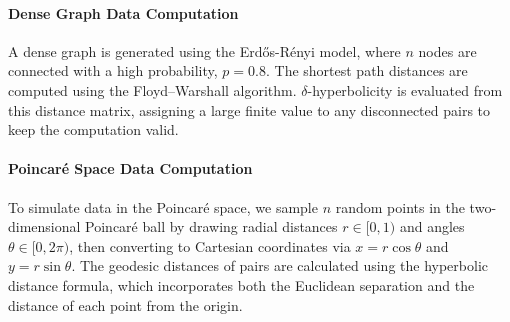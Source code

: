 \documentclass[]{Liebert_Author_revised}
\begin{document}
\paragraph{Dense Graph Data Computation} 
A dense graph is generated using the Erdős-Rényi model, where $n$ nodes are connected with a high probability, $p = 0.8$. The shortest path distances are computed using the Floyd–Warshall algorithm. $\delta$-hyperbolicity is evaluated from this distance matrix, assigning a large finite value to any disconnected pairs to keep the computation valid.

\paragraph{Poincaré Space Data Computation} 
To simulate data in the Poincaré space, we sample $n$ random points in the two-dimensional Poincaré ball by drawing radial distances $r \in [0,1)$ and angles $\theta \in [0,2\pi)$, then converting to Cartesian coordinates via $x = r\cos\theta$ and $y = r\sin\theta$. The geodesic distances of pairs are calculated using the hyperbolic distance formula, which incorporates both the Euclidean separation and the distance of each point from the origin.

\end{document}
